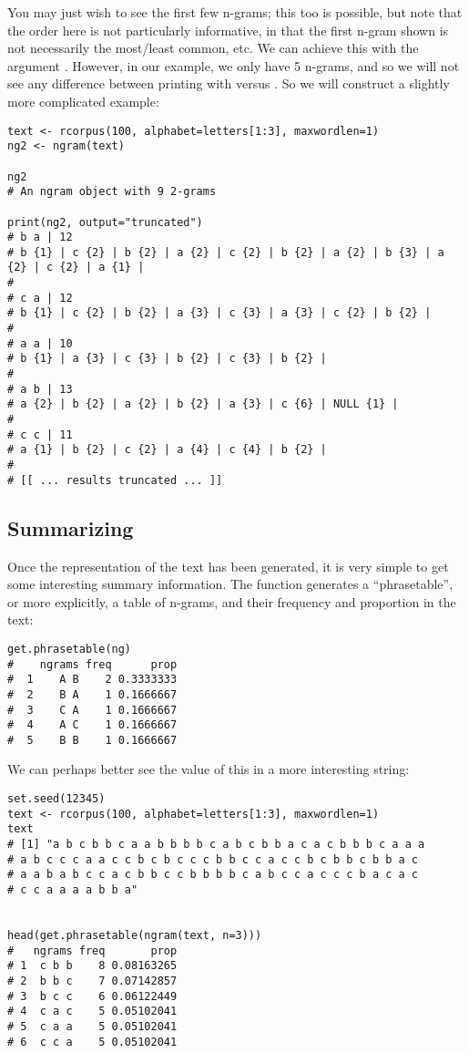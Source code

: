 You may just wish to see the first few n-grams; this too is possible, but
note that the order here is not particularly
informative, in that the first n-gram shown is not necessarily the most/least
common, etc.  We can achieve this with the  argument 
.  However, in our example, we only have 5 n-grams,
and so we will not see any difference between printing with 
versus .  So we will construct a slightly more
complicated example:
\begin{lstlisting}[language=rr]
text <- rcorpus(100, alphabet=letters[1:3], maxwordlen=1)
ng2 <- ngram(text)

ng2
# An ngram object with 9 2-grams

print(ng2, output="truncated")
# b a | 12 
# b {1} | c {2} | b {2} | a {2} | c {2} | b {2} | a {2} | b {3} | a {2} | c {2} | a {1} | 
# 
# c a | 12 
# b {1} | c {2} | b {2} | a {3} | c {3} | a {3} | c {2} | b {2} | 
# 
# a a | 10 
# b {1} | a {3} | c {3} | b {2} | c {3} | b {2} | 
# 
# a b | 13 
# a {2} | b {2} | a {2} | b {2} | a {3} | c {6} | NULL {1} | 
# 
# c c | 11 
# a {1} | b {2} | c {2} | a {4} | c {4} | b {2} | 
# 
# [[ ... results truncated ... ]]
\end{lstlisting}



\subsection{Summarizing}

Once the  representation of the text has been generated, it is very 
simple to get some interesting summary information.  The function 
 generates a ``phrasetable'', or more explicitly, a 
table of n-grams, and their frequency and proportion in the text:
\begin{lstlisting}[language=rr]
get.phrasetable(ng)
#    ngrams freq      prop
#  1    A B    2 0.3333333
#  2    B A    1 0.1666667
#  3    C A    1 0.1666667
#  4    A C    1 0.1666667
#  5    B B    1 0.1666667
\end{lstlisting}
We can perhaps better see the value of this in a more interesting string:
\begin{lstlisting}[language=rr]
set.seed(12345)
text <- rcorpus(100, alphabet=letters[1:3], maxwordlen=1)
text
# [1] "a b c b b c a a b b b b c a b c b b a c a c b b b c a a a
# a b c c c a a c c b c b c c c b b c c a c c b c b b c b b a c
# a a b a b c c a c b b c c b b b b c a b c c a c c c b a c a c
# c c a a a a b b a"


head(get.phrasetable(ngram(text, n=3)))
#   ngrams freq       prop
# 1  c b b    8 0.08163265
# 2  b b c    7 0.07142857
# 3  b c c    6 0.06122449
# 4  c a c    5 0.05102041
# 5  c a a    5 0.05102041
# 6  c c a    5 0.05102041
\end{lstlisting}

